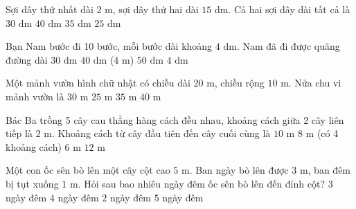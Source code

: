 \begin{ex} %
Sợi dây thứ nhất dài $2\text{ m}$, sợi dây thứ hai dài $15\text{ dm}$. Cả hai sợi dây dài tất cả là
\choice
{$30\text{ dm}$}
{$40\text{ dm}$}
{\True $35\text{ dm}$}
{$25\text{ dm}$}
\end{ex}

\begin{ex} %
Bạn Nam bước đi 10 bước, mỗi bước dài khoảng $4\text{ dm}$. Nam đã đi được quãng đường dài
\choice
{$30\text{ dm}$}
{\True $40\text{ dm}$ ($4\text{ m}$)}
{$50\text{ dm}$}
{$4\text{ dm}$}
\end{ex}

\begin{ex} %
Một mảnh vườn hình chữ nhật có chiều dài $20\text{ m}$, chiều rộng $10\text{ m}$. Nửa chu vi mảnh vườn là
\choice
{\True $30\text{ m}$}
{$25\text{ m}$}
{$35\text{ m}$}
{$40\text{ m}$}
\end{ex}

\begin{ex} %
Bác Ba trồng 5 cây cau thẳng hàng cách đều nhau, khoảng cách giữa 2 cây liên tiếp là $2\text{ m}$. Khoảng cách từ cây đầu tiên đến cây cuối cùng là
\choice
{$10\text{ m}$}
{\True $8\text{ m}$ (có 4 khoảng cách)}
{$6\text{ m}$}
{$12\text{ m}$}
\end{ex}

\begin{ex} %
Một con ốc sên bò lên một cây cột cao $5\text{ m}$. Ban ngày bò lên được $3\text{ m}$, ban đêm bị tụt xuống $1\text{ m}$. Hỏi sau bao nhiêu ngày đêm ốc sên bò lên đến đỉnh cột?
\choice
{$3$ ngày đêm}
{$4$ ngày đêm}
{\True $2$ ngày đêm}
{$5$ ngày đêm}
\end{ex}

